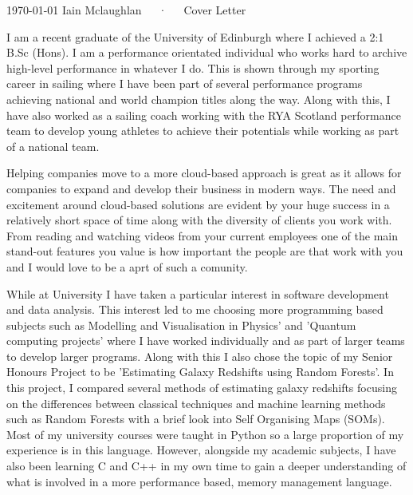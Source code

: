 \documentclass[11pt, a4paper]{awesome-cv}
\begin{document}
\makecvheader[R]

\makecvfooter
  {\today}
  {Iain Mclaughlan~~~·~~~Cover Letter}
  {}

\makelettertitle

\begin{cvletter}

I am a recent graduate of the University of Edinburgh where I achieved a 2:1 B.Sc (Hons). I am a performance orientated individual who works hard to archive high-level performance in whatever I do. This is shown through my sporting career in sailing where I have been part of several performance programs achieving national and world champion titles along the way. Along with this, I have also worked as a sailing coach working with the RYA Scotland performance team to develop young athletes to achieve their potentials while working as part of a national team.

Helping companies move to a more cloud-based approach is great as it allows for companies to expand and develop their business in modern ways. The need and excitement around cloud-based solutions are evident by your huge success in a relatively short space of time along with the diversity of clients you work with. From reading and watching videos from your current employees one of the main stand-out features you value is how important the people are that work with you and I would love to be a aprt of such a comunity.

While at University I have taken a particular interest in software development and data analysis. This interest led to me choosing more programming based subjects such as Modelling and Visualisation in Physics' and 'Quantum computing projects' where I have worked individually and as part of larger teams to develop larger programs. Along with this I also chose the topic of my Senior Honours Project to be 'Estimating Galaxy Redshifts using Random Forests'. In this project, I compared several methods of estimating galaxy redshifts focusing on the differences between classical techniques and machine learning methods such as Random Forests with a brief look into Self Organising Maps (SOMs). Most of my university courses were taught in Python so a large proportion of my experience is in this language. However, alongside my academic subjects, I have also been learning C and C++ in my own time to gain a deeper understanding of what is involved in a more performance based, memory management language.


\end{cvletter}


\makeletterclosing
\end{document}
